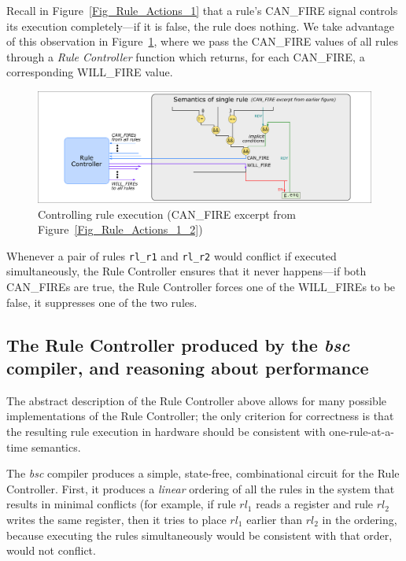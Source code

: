 Recall in Figure~\ref{Fig_Rule_Actions_1} that a rule's CAN\_FIRE
signal controls its execution completely---if it is false, the rule
does nothing.  We take advantage of this observation in
Figure~\ref{Fig_Rule_Actions_Controlled}, where we pass the CAN\_FIRE
values of all rules through a \emph{Rule Controller} function which
returns, for each CAN\_FIRE, a corresponding WILL\_FIRE value.
\begin{figure}[htbp]
  \centerline{\includegraphics[width=6in,angle=0]{Figures/Fig_Rule_Actions_Controlled}}
  \caption{\label{Fig_Rule_Actions_Controlled}
           Controlling rule execution
	   (CAN\_FIRE excerpt from Figure~\ref{Fig_Rule_Actions_1_2})}
\end{figure}

Whenever a pair of rules \verb|rl_r1| and \verb|rl_r2| would conflict
if executed simultaneously, the Rule Controller ensures that it never
happens---if both CAN\_FIREs are true, the Rule Controller forces one
of the WILL\_FIREs to be false, {\ie} it suppresses one of the two
rules.


\subsection{The Rule Controller produced by the \emph{bsc} compiler,
and reasoning about performance}

The abstract description of the Rule Controller above allows for many
possible implementations of the Rule Controller; the only criterion
for correctness is that the resulting rule execution in hardware
should be consistent with one-rule-at-a-time semantics.

The \emph{bsc} compiler produces a simple, state-free, combinational
circuit for the Rule Controller.  First, it produces a \emph{linear}
ordering of all the rules in the system that results in minimal
conflicts (for example, if rule $rl_1$ reads a register and rule
$rl_2$ writes the same register, then it tries to place $rl_1$ earlier
than $rl_2$ in the ordering, because executing the rules
simultaneously would be consistent with that order, {\ie} would not
conflict.

